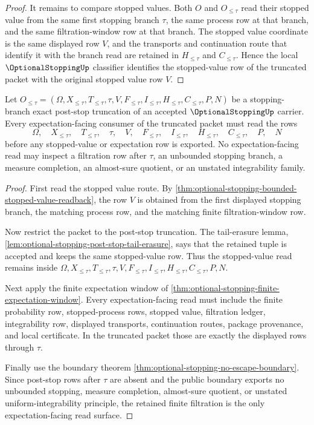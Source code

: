 \begin{proof}
It remains to compare stopped values. Both $O$ and $O_{\leq\tau}$ read their stopped value from the same first stopping branch $\tau$, the same process row at that branch, and the same filtration-window row at that branch. The stopped value coordinate is the same displayed row $V$, and the transports and continuation route that identify it with the branch read are retained in $H_{\leq\tau}$ and $C_{\leq\tau}$. Hence the local $\OptionalStoppingUp$ classifier identifies the stopped-value row of the truncated packet with the original stopped value row $V$.
\end{proof}

\begin{theorem}
\label{thm:optional-stopping-finite-filtration-nonescape}
Let $O_{\leq\tau}=(\Omega,X_{\leq\tau},T_{\leq\tau},\tau,V,F_{\leq\tau},I_{\leq\tau},H_{\leq\tau},C_{\leq\tau},P,N)$ be a stopping-branch exact post-stop truncation of an accepted $\OptionalStoppingUp$ carrier. Every expectation-facing consumer of the truncated packet must read the rows
$$
\Omega,\quad X_{\leq\tau},\quad T_{\leq\tau},\quad \tau,\quad V,\quad F_{\leq\tau},\quad I_{\leq\tau},\quad H_{\leq\tau},\quad C_{\leq\tau},\quad P,\quad N
$$
before any stopped-value or expectation row is exported. No expectation-facing read may inspect a filtration row after $\tau$, an unbounded stopping branch, a measure completion, an almost-sure quotient, or an unstated integrability family.
\end{theorem}
\begin{proof}
First read the stopped value route. By \autoref{thm:optional-stopping-bounded-stopped-value-readback}, the row $V$ is obtained from the first displayed stopping branch, the matching process row, and the matching finite filtration-window row.

Now restrict the packet to the post-stop truncation. The tail-erasure lemma, \autoref{lem:optional-stopping-post-stop-tail-erasure}, says that the retained tuple is accepted and keeps the same stopped-value row. Thus the stopped-value read remains inside $\Omega,X_{\leq\tau},T_{\leq\tau},\tau,V,F_{\leq\tau},I_{\leq\tau},H_{\leq\tau},C_{\leq\tau},P,N$.

Next apply the finite expectation window of \autoref{thm:optional-stopping-finite-expectation-window}. Every expectation-facing read must include the finite probability row, stopped-process rows, stopped value, filtration ledger, integrability row, displayed transports, continuation routes, package provenance, and local certificate. In the truncated packet those are exactly the displayed rows through $\tau$.

Finally use the boundary theorem \autoref{thm:optional-stopping-no-escape-boundary}. Since post-stop rows after $\tau$ are absent and the public boundary exports no unbounded stopping, measure completion, almost-sure quotient, or unstated uniform-integrability principle, the retained finite filtration is the only expectation-facing read surface.
\end{proof}
